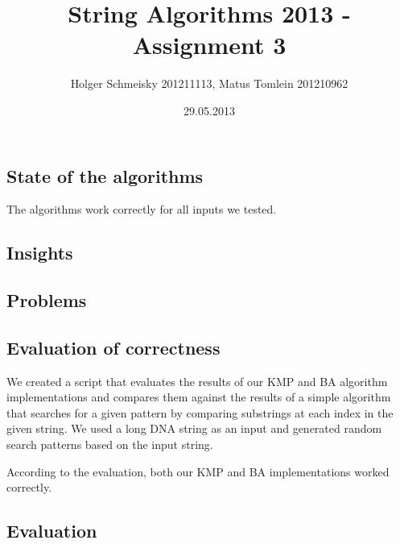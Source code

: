 \documentclass[a4paper,10pt]{article}
\title{String Algorithms 2013 - Assignment 3}
\author{Holger Schmeisky  201211113, Matus Tomlein 201210962}
\date{29.05.2013}
\begin{document}
\maketitle

\subsection*{State of the algorithms}
The algorithms work correctly for all inputs we tested.

\subsection*{Insights}


\subsection*{Problems}


\subsection*{Evaluation of correctness}

We created a script that evaluates the results of our KMP and BA algorithm
implementations and compares them against the results of a simple algorithm
that searches for a given pattern by comparing substrings at each index
in the given string.
We used a long DNA string as an input and generated random search patterns
based on the input string.

According to the evaluation, both our KMP and BA implementations worked
correctly.

\clearpage
\subsection*{Evaluation}
\end{document}
